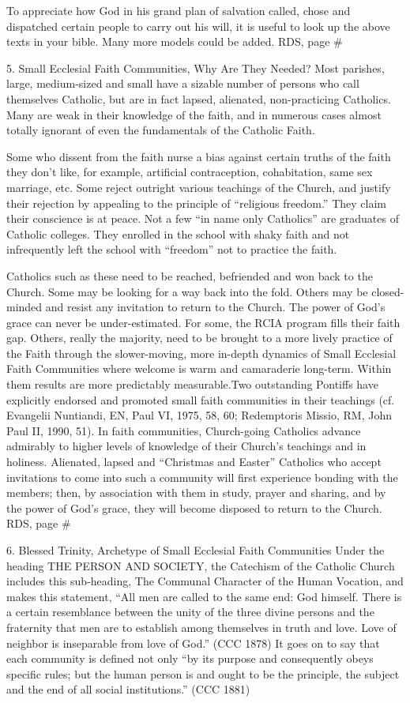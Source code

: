\documentclass[oneside]{book}
\begin{document}
To appreciate how God in his grand plan of salvation called, chose and
dispatched certain people to carry out his will, it is useful to look up the
above texts in your bible. Many more models could be added.
RDS, page \#

5. Small Ecclesial Faith Communities, Why Are They Needed?
Most parishes, large, medium-sized and small have a sizable number of persons
who call themselves Catholic, but are in fact lapsed, alienated, non-practicing
Catholics. Many are weak in their knowledge of the faith, and in numerous cases
almost totally ignorant of even the fundamentals of the Catholic Faith.

Some who dissent from the faith nurse a bias against certain truths of the faith
they don't like, for example, artificial contraception, cohabitation, same sex
marriage, etc. Some reject outright various teachings of the Church, and justify
their rejection by appealing to the principle of ``religious freedom.'' They
claim their conscience is at peace. Not a few ``in name only Catholics'' are
graduates of Catholic colleges. They enrolled in the school with shaky faith and
not infrequently left the school with ``freedom'' not to practice the faith.

Catholics such as these need to be reached, befriended and won back to the
Church. Some may be looking for a way back into the fold. Others may be
closed-minded and resist any invitation to return to the Church. The power of
God's grace can never be under-estimated. For some, the RCIA program fills their
faith gap. Others, really the majority, need to be brought to a more lively
practice of the Faith through the slower-moving, more in-depth dynamics of Small
Ecclesial Faith Communities where welcome is warm and camaraderie
long-term. Within them results are more predictably measurable.Two outstanding
Pontiffs have explicitly endorsed and promoted small faith communities in their
teachings (cf. Evangelii Nuntiandi, EN, Paul VI, 1975, 58, 60; Redemptoris
Missio, RM, John Paul II, 1990, 51). In faith communities, Church-going
Catholics advance admirably to higher levels of knowledge of their Church's
teachings and in holiness. Alienated, lapsed and ``Christmas and Easter''
Catholics who accept invitations to come into such a community will first
experience bonding with the members; then, by association with them in study,
prayer and sharing, and by the power of God's grace, they will become disposed
to return to the Church.
RDS, page \#

6. Blessed Trinity, Archetype of Small Ecclesial Faith Communities
Under the heading THE PERSON AND SOCIETY, the Catechism of the Catholic Church
includes this sub-heading, The Communal Character of the Human Vocation, and
makes this statement, ``All men are called to the same end: God himself. There
is a certain resemblance between the unity of the three divine persons and the
fraternity that men are to establish among themselves in truth and love. Love of
neighbor is inseparable from love of God.'' (CCC 1878) It goes on to say that
each community is defined not only ``by its purpose  and consequently obeys
specific rules; but the human person  is and ought to be the principle, the
subject and the end of all social institutions.'' (CCC 1881)
\end{document}
